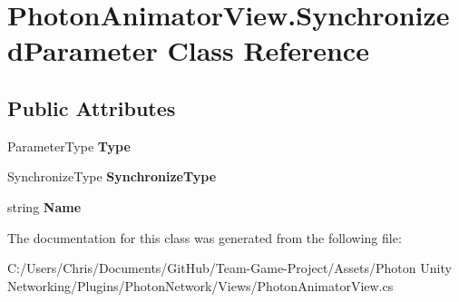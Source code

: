\hypertarget{class_photon_animator_view_1_1_synchronized_parameter}{}\section{Photon\+Animator\+View.\+Synchronized\+Parameter Class Reference}
\label{class_photon_animator_view_1_1_synchronized_parameter}
\subsection*{Public Attributes}
\begin{DoxyCompactItemize}
\item 
Parameter\+Type {\bfseries Type}\hypertarget{class_photon_animator_view_1_1_synchronized_parameter_aed91d06642473f7978a3675b9e08e5de}{}\label{class_photon_animator_view_1_1_synchronized_parameter_aed91d06642473f7978a3675b9e08e5de}

\item 
Synchronize\+Type {\bfseries Synchronize\+Type}\hypertarget{class_photon_animator_view_1_1_synchronized_parameter_a3bca909eb8a9c74c41c40c5ade8851f3}{}\label{class_photon_animator_view_1_1_synchronized_parameter_a3bca909eb8a9c74c41c40c5ade8851f3}

\item 
string {\bfseries Name}\hypertarget{class_photon_animator_view_1_1_synchronized_parameter_afdeabdbb8e7fa234bd2743435a4362e3}{}\label{class_photon_animator_view_1_1_synchronized_parameter_afdeabdbb8e7fa234bd2743435a4362e3}

\end{DoxyCompactItemize}


The documentation for this class was generated from the following file\+:\begin{DoxyCompactItemize}
\item 
C\+:/\+Users/\+Chris/\+Documents/\+Git\+Hub/\+Team-\/\+Game-\/\+Project/\+Assets/\+Photon Unity Networking/\+Plugins/\+Photon\+Network/\+Views/Photon\+Animator\+View.\+cs\end{DoxyCompactItemize}
